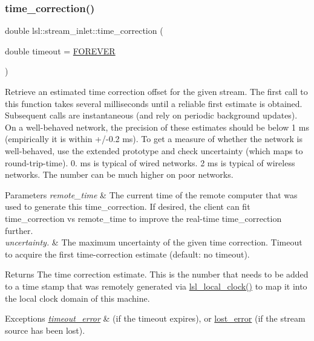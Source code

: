 \subsubsection{\texorpdfstring{time\+\_\+correction()}{time\_correction()}\hspace{0.1cm}{\footnotesize\ttfamily [1/2]}}
{\footnotesize\ttfamily double lsl\+::stream\+\_\+inlet\+::time\+\_\+correction (\begin{DoxyParamCaption}\item[{double}]{timeout = {\ttfamily \hyperlink{namespacelsl_a74cfbc9077aca21295117217249721ed}{F\+O\+R\+E\+V\+ER}} }\end{DoxyParamCaption})\hspace{0.3cm}{\ttfamily [inline]}}

Retrieve an estimated time correction offset for the given stream. The first call to this function takes several milliseconds until a reliable first estimate is obtained. Subsequent calls are instantaneous (and rely on periodic background updates). On a well-\/behaved network, the precision of these estimates should be below 1 ms (empirically it is within +/-\/0.2 ms). To get a measure of whether the network is well-\/behaved, use the extended prototype and check uncertainty (which maps to round-\/trip-\/time). 0. ms is typical of wired networks. 2 ms is typical of wireless networks. The number can be much higher on poor networks.


\begin{DoxyParams}{Parameters}
{\em remote\+\_\+time} & The current time of the remote computer that was used to generate this time\+\_\+correction. If desired, the client can fit time\+\_\+correction vs remote\+\_\+time to improve the real-\/time time\+\_\+correction further. \\
\hline
{\em uncertainty.} & The maximum uncertainty of the given time correction.  Timeout to acquire the first time-\/correction estimate (default\+: no timeout). \\
\hline
\end{DoxyParams}
\begin{DoxyReturn}{Returns}
The time correction estimate. This is the number that needs to be added to a time stamp that was remotely generated via \hyperlink{namespacelsl_a475274f88a060924c9bd1b38879ec63a}{lsl\+\_\+local\+\_\+clock()} to map it into the local clock domain of this machine. 
\end{DoxyReturn}

\begin{DoxyExceptions}{Exceptions}
{\em \hyperlink{classlsl_1_1timeout__error}{timeout\+\_\+error}} & (if the timeout expires), or \hyperlink{classlsl_1_1lost__error}{lost\+\_\+error} (if the stream source has been lost). \\
\hline
\end{DoxyExceptions}
\mbox{\label{classlsl_1_1stream__inlet_a9603f3365093f43f9e2bae1b9e9b2cd8}} 
